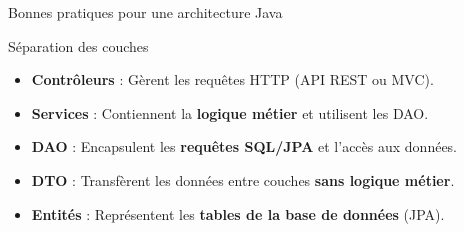 \documentclass[aspectratio=169,10pt]{beamer}
\begin{document}
\begin{frame}{Bonnes pratiques pour une architecture Java}
    \begin{block}{Séparation des couches}
        \begin{itemize}
            \item \textbf{Contrôleurs} : Gèrent les requêtes HTTP (API REST ou MVC).
            \item \textbf{Services} : Contiennent la \textbf{logique métier} et utilisent les DAO.
            \item \textbf{DAO} : Encapsulent les \textbf{requêtes SQL/JPA} et l'accès aux données.
            \item \textbf{DTO} : Transfèrent les données entre couches \textbf{sans logique métier}.
            \item \textbf{Entités} : Représentent les \textbf{tables de la base de données} (JPA).
        \end{itemize}
    \end{block}
\end{frame}
\end{document}
